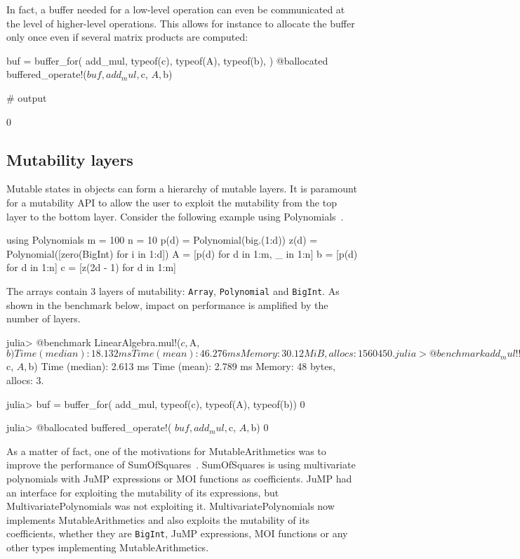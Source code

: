 \documentclass{juliacon}
\newcommand{\ma}{MutableArithmetics}
\begin{document}
In fact, a buffer needed for a low-level operation can even be communicated
at the level of higher-level operations.
This allows for instance to allocate the buffer only once even if
several matrix products are computed:

\begin{jllisting}
buf = buffer_for(
    add_mul,
    typeof(c),
    typeof(A),
    typeof(b),
)
@ballocated buffered_operate!($buf, add_mul, $c, $A, $b)

# output

0
\end{jllisting}

\subsection{Mutability layers}
Mutable states in objects can form a hierarchy of mutable layers.
It is paramount for a mutability API to allow the user to exploit
the mutability from the top layer to the bottom layer.
Consider the following example using Polynomials~\cite{verzani2021polynomials}.
\begin{jllisting}
using Polynomials
m = 100
n = 10
p(d) = Polynomial(big.(1:d))
z(d) = Polynomial([zero(BigInt) for i in 1:d])
A = [p(d) for d in 1:m, _ in 1:n]
b = [p(d) for d in 1:n]
c = [z(2d - 1) for d in 1:m]
\end{jllisting}
The arrays contain 3 layers of mutability:
\lstinline|Array|, \lstinline|Polynomial| and \lstinline|BigInt|.
As shown in the benchmark below,
impact on performance is amplified by the number of layers.
\begin{jllisting}
julia> @benchmark LinearAlgebra.mul!($c, $A, $b)
 Time  (median):     18.132 ms
 Time  (mean):       46.276 ms
 Memory: 30.12 MiB, allocs: 1560450.

julia> @benchmark add_mul!!($c, $A, $b)
 Time  (median):     2.613 ms
 Time  (mean):       2.789 ms
 Memory: 48 bytes, allocs: 3.

julia> buf = buffer_for(
    add_mul, typeof(c), typeof(A), typeof(b))
0

julia> @ballocated buffered_operate!(
           $buf, add_mul, $c, $A, $b)
0
\end{jllisting}

As a matter of fact, one of the motivations for \ma{}
was to improve the performance of SumOfSquares~\cite{weisser2019polynomial}.
SumOfSquares is using multivariate polynomials with
JuMP expressions or MOI functions as coefficients.
JuMP had an interface for exploiting the mutability of its expressions,
but MultivariatePolynomials was not exploiting it.
MultivariatePolynomials now implements \ma{}
and also exploits the mutability of its coefficients, whether they are \lstinline|BigInt|, JuMP expressions, MOI functions or any other types implementing \ma{}.
\end{document}
